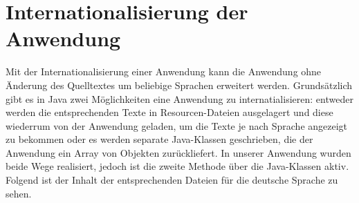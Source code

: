 \section{Internationalisierung der Anwendung}
Mit der Internationalisierung einer Anwendung kann die Anwendung ohne Änderung des Quelltextes um beliebige Sprachen erweitert werden.
Grundsätzlich gibt es in Java zwei Möglichkeiten eine Anwendung zu internatialisieren:
entweder werden die entsprechenden Texte in Resourcen-Dateien ausgelagert und diese wiederrum von der Anwendung geladen, um die Texte je nach Sprache
angezeigt zu bekommen oder es werden separate Java-Klassen geschrieben, die der Anwendung ein Array von Objekten zurückliefert.
In unserer Anwendung wurden beide Wege realisiert, jedoch ist die zweite Methode über die Java-Klassen aktiv.
Folgend ist der Inhalt der entsprechenden Dateien für die deutsche Sprache zu sehen.